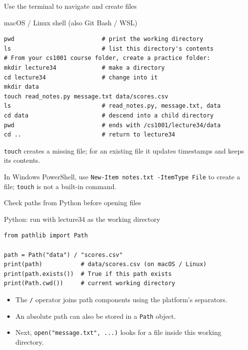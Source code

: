 \documentclass[aspectratio=169,10pt]{beamer}
\begin{document}
\begin{frame}[fragile]{Use the terminal to navigate and create files}
\begin{block}{macOS / Linux shell (also Git Bash / WSL)}
\begin{Verbatim}[fontsize=\scriptsize]
pwd                         # print the working directory
ls                          # list this directory's contents
# From your cs1001 course folder, create a practice folder:
mkdir lecture34             # make a directory
cd lecture34                # change into it
mkdir data
touch read_notes.py message.txt data/scores.csv
ls                          # read_notes.py, message.txt, data
cd data                     # descend into a child directory
pwd                         # ends with /cs1001/lecture34/data
cd ..                       # return to lecture34
\end{Verbatim}
\end{block}
\small \texttt{touch} creates a missing file; for an existing file it updates timestamps and keeps its contents.
\par\vspace{3pt}
{\scriptsize In Windows PowerShell, use \texttt{New-Item notes.txt -ItemType File} to create a file; \texttt{touch} is not a built-in command.}
\end{frame}

\begin{frame}[fragile]{Check paths from Python before opening files}
\begin{block}{Python: run with lecture34 as the working directory}
\begin{Verbatim}[fontsize=\footnotesize]
from pathlib import Path

path = Path("data") / "scores.csv"
print(path)           # data/scores.csv (on macOS / Linux)
print(path.exists())  # True if this path exists
print(Path.cwd())     # current working directory
\end{Verbatim}
\end{block}
\small\begin{itemize}
\item The \texttt{/} operator joins path components using the platform's separators.
\item An absolute path can also be stored in a \texttt{Path} object.
\item Next, \texttt{open("message.txt", ...)} looks for a file inside this working directory.
\end{itemize}
\end{frame}
\end{document}
